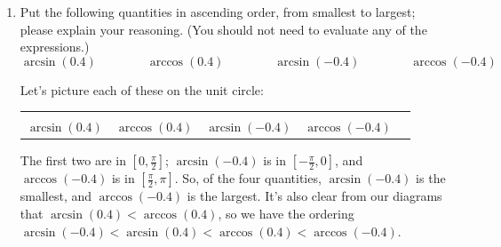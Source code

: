 \documentclass{article}
\begin{document}
\begin{enumerate}[topsep=0pt]
\begin{enumerate}

  \item
    \begin{problem}[1.5in]
      Put the following quantities in ascending order, from smallest to
      largest; please explain your reasoning. (You should not need to evaluate
      any of the expressions.)
      \[ \arcsin (0.4) \qquad\qquad \arccos (0.4) \qquad\qquad \arcsin (-0.4) \qquad\qquad 
      \arccos (-0.4)\] 
    \end{problem}

    \begin{solution}
      Let's picture each of these on the unit circle:
      \begin{center}
        \begin{tabular}{ccccc}
          \begin{tikzangle}[angle=rad(asin(0.4)), ytick={0.4}, width=1.85in, height=1.85in]             
          \end{tikzangle} &
          \begin{tikzangle}[angle=rad(acos(0.4)), xtick={0.4}, width=1.85in, height=1.85in]            
          \end{tikzangle} &
          \begin{tikzangle}[angle=rad(asin(-0.4)), ytick={-0.4}, width=1.85in, height=1.85in]          
          \end{tikzangle} &
          \begin{tikzangle}[angle=rad(acos(-0.4)), xtick={-0.4}, width=1.85in, height=1.85in]          
          \end{tikzangle} \\
          $\arcsin(0.4)$ & $\arccos(0.4)$ & 
          $\arcsin(-0.4)$ & $\arccos(-0.4)$
        \end{tabular}
      \end{center}
      The first two are in $\left[ 0, \frac{\pi}{2} \right]$;
      $\arcsin(-0.4)$ is in $\left[ - \frac{\pi}{2}, 0 \right]$, and
      $\arccos(-0.4)$ is in $\left[ \frac{\pi}{2}, \pi \right]$.  So, of
      the four quantities, $\arcsin(-0.4)$ is the smallest, and
      $\arccos(-0.4)$ is the largest.  It's also clear from our diagrams
      that $\arcsin(0.4) < \arccos(0.4)$, so we have the ordering \\
      $\boxed{\arcsin(-0.4) < \arcsin(0.4) < \arccos(0.4) <
        \arccos(-0.4)}$.
    \end{solution}


\end{enumerate}
\end{enumerate}
\end{document}
